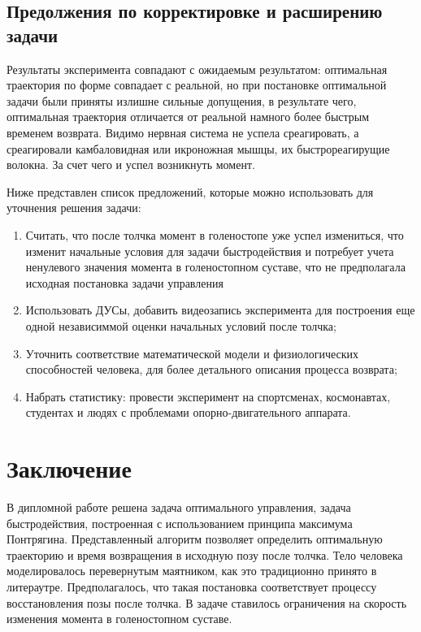 \documentclass[a4paper,12pt, openany]{book}
\theoremstyle{plain} %
\theoremstyle{definition} %
\theoremstyle{remark} %
\numberwithin{equation}{chapter}
\begin{document}
{\section{Предолжения по корректировке и расширению задачи}

Результаты эксперимента совпадают с ожидаемым результатом: оптимальная траектория по форме совпадает с реальной,
 но при постановке оптимальной задачи были приняты излишне сильные допущения, в результате чего, оптимальная траектория отличается от реальной намного более быстрым временем возврата.
Видимо нервная система не успела среагировать, а среагировали камбаловидная или икроножная мышцы, их быстрореагирущие волокна.
За счет чего и успел возникнуть момент.

Ниже представлен список предложений, которые можно использовать для уточнения решения задачи:
\begin{enumerate}
    \item Считать, что после толчка момент в голеностопе уже успел измениться, что изменит начальные условия для задачи быстродействия 
    и потребует учета ненулевого значения момента в голеностопном суставе, что не предполагала исходная постановка задачи управления
    \item Использовать ДУСы, добавить видеозапись эксперимента для построения еще одной независиммой оценки начальных условий после толчка;
    \item Уточнить соответствие математической модели и физиологических способностей человека, для более детального описания процесса возврата;
    \item Набрать статистику: провести эксперимент на спортсменах, космонавтах, студентах и людях с проблемами опорно-двигательного аппарата.
\end{enumerate}


\newpage


\chapter*{Заключение}


В дипломной работе решена задача оптимального управления,
 задача быстродействия, построенная с использованием принципа максимума Понтрягина.
 Представленный алгоритм позволяет определить оптимальную траекторию и время возвращения в исходную позу после толчка.
Тело человека моделировалось перевернутым маятником, как это традиционно принято в литераутре\cite{gurfincel}. Предполагалось, что такая постановка соответствует процессу восстановления позы после толчка.
В задаче ставилось ограничения на скорость изменения момента в голеностопном суставе.

}
\end{document}
